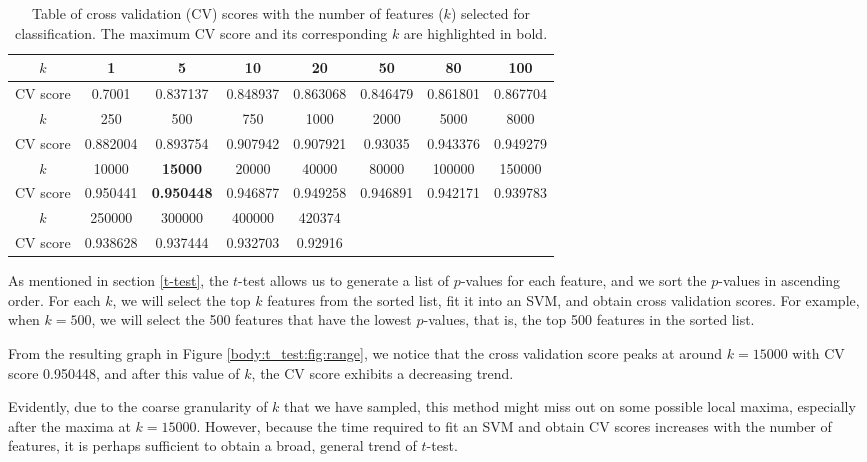 \documentclass[12pt, twoside, a4paper]{report}
\begin{document}
\begin{table}[h!]
\centering
\begin{tabular}{|c||c|c|c|c|c|c|c|}
\hline
$k$      & 1        & 5        & 10       & 20       & 50       & 80       & 100      \\ \hline
CV score & 0.7001   & 0.837137 & 0.848937 & 0.863068 & 0.846479 & 0.861801 & 0.867704 \\ \hline \hline
$k$      & 250      & 500      & 750      & 1000     & 2000     & 5000     & 8000     \\ \hline
CV score & 0.882004 & 0.893754 & 0.907942 & 0.907921 & 0.93035  & 0.943376 & 0.949279 \\ \hline \hline
$k$      & 10000    & \textbf{15000}    & 20000    & 40000    & 80000    & 100000   & 150000   \\ \hline
CV score & 0.950441 & \textbf{0.950448} & 0.946877 & 0.949258 & 0.946891 & 0.942171 & 0.939783 \\ \hline \hline
$k$      & 250000   & 300000   & 400000   & 420374   &          &          &          \\ \hline
CV score & 0.938628 & 0.937444 & 0.932703 & 0.92916  &          &          &          \\ \hline
\end{tabular}
\caption{Table of cross validation (CV) scores with the number of features ($k$) selected for classification. The maximum CV score and its corresponding $k$ are highlighted in bold.}
\label{t_test:table:range}
\end{table}

As mentioned in section \ref{t-test}, the $t$-test allows us to generate a list of $p$-values for each feature, and we sort the $p$-values in ascending order. For each $k$, we will select the top $k$ features from the sorted list, fit it into an SVM, and obtain cross validation scores. For example, when $k=500$, we will select the 500 features that have the lowest $p$-values, that is, the top 500 features in the sorted list.

From the resulting graph in Figure \ref{body:t_test:fig:range}, we notice that the cross validation score peaks at around $k=15000$ with CV score 0.950448, and after this value of $k$, the CV score exhibits a decreasing trend.

Evidently, due to the coarse granularity of $k$ that we have sampled, this method might miss out on some possible local maxima, especially after the maxima at $k=15000$. However, because the time required to fit an SVM and obtain CV scores increases with the number of features, it is perhaps sufficient to obtain a broad, general trend of $t$-test.
\end{document}
